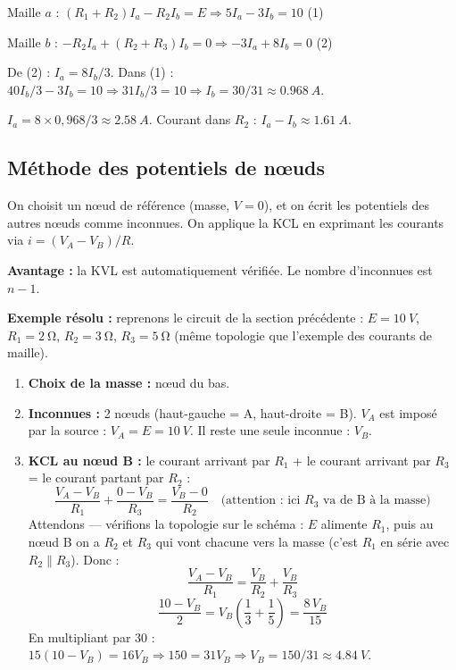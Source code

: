 \documentclass[12pt,a4paper,twoside]{book}
\begin{document}
Maille $a$ : $(R_1 + R_2)I_a - R_2 I_b = E \Rightarrow 5I_a - 3I_b = 10$ \quad (1)

Maille $b$ : $-R_2 I_a + (R_2 + R_3)I_b = 0 \Rightarrow -3I_a + 8I_b = 0$ \quad (2)

De (2) : $I_a = 8I_b/3$. Dans (1) : $40I_b/3 - 3I_b = 10 \Rightarrow 31I_b/3 = 10 \Rightarrow I_b = 30/31 \approx \SI{0.968}{A}$.

$I_a = 8 \times 0{,}968/3 \approx \SI{2.58}{A}$. Courant dans $R_2$ : $I_a - I_b \approx \SI{1.61}{A}$.

\subsection{Méthode des potentiels de n\oe uds}

On choisit un n\oe ud de référence (masse, $V = 0$), et on écrit les potentiels des autres n\oe uds comme inconnues. On applique la KCL en exprimant les courants via $i = (V_A - V_B)/R$.

\textbf{Avantage :} la KVL est automatiquement vérifiée. Le nombre d'inconnues est $n - 1$.

\textbf{Exemple résolu :} reprenons le circuit de la section précédente : $E = \SI{10}{V}$, $R_1 = \SI{2}{\ohm}$, $R_2 = \SI{3}{\ohm}$, $R_3 = \SI{5}{\ohm}$ (même topologie que l'exemple des courants de maille).

\begin{enumerate}[nosep]
\item \textbf{Choix de la masse :} n\oe ud du bas.
\item \textbf{Inconnues :} 2 n\oe uds (haut-gauche = A, haut-droite = B). $V_A$ est imposé par la source : $V_A = E = \SI{10}{V}$. Il reste une seule inconnue : $V_B$.
\item \textbf{KCL au n\oe ud B :} le courant arrivant par $R_1$ + le courant arrivant par $R_3$ = le courant partant par $R_2$ :
\[
\frac{V_A - V_B}{R_1} + \frac{0 - V_B}{R_3} = \frac{V_B - 0}{R_2} \quad \text{(attention : ici } R_3 \text{ va de B à la masse)}
\]
Attendons --- vérifions la topologie sur le schéma : $E$ alimente $R_1$, puis au n\oe ud B on a $R_2$ et $R_3$ qui vont chacune vers la masse (c'est $R_1$ en série avec $R_2 \parallel R_3$). Donc :
\[
\frac{V_A - V_B}{R_1} = \frac{V_B}{R_2} + \frac{V_B}{R_3}
\]
\[
\frac{10 - V_B}{2} = V_B\left(\frac{1}{3} + \frac{1}{5}\right) = \frac{8\,V_B}{15}
\]
En multipliant par 30 : $15(10-V_B) = 16V_B \Rightarrow 150 = 31V_B \Rightarrow V_B = 150/31 \approx \SI{4.84}{V}$.
\end{enumerate}
\end{document}

